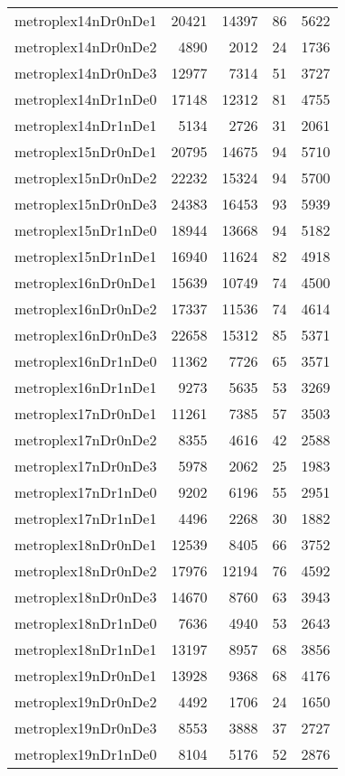 \begin{longtable}{lrrrr}
metroplex14nDr0nDe1 & 20421 & 14397 & 86 & 5622 \\
metroplex14nDr0nDe2 & 4890 & 2012 & 24 & 1736 \\
metroplex14nDr0nDe3 & 12977 & 7314 & 51 & 3727 \\
metroplex14nDr1nDe0 & 17148 & 12312 & 81 & 4755 \\
metroplex14nDr1nDe1 & 5134 & 2726 & 31 & 2061 \\
metroplex15nDr0nDe1 & 20795 & 14675 & 94 & 5710 \\
metroplex15nDr0nDe2 & 22232 & 15324 & 94 & 5700 \\
metroplex15nDr0nDe3 & 24383 & 16453 & 93 & 5939 \\
metroplex15nDr1nDe0 & 18944 & 13668 & 94 & 5182 \\
metroplex15nDr1nDe1 & 16940 & 11624 & 82 & 4918 \\
metroplex16nDr0nDe1 & 15639 & 10749 & 74 & 4500 \\
metroplex16nDr0nDe2 & 17337 & 11536 & 74 & 4614 \\
metroplex16nDr0nDe3 & 22658 & 15312 & 85 & 5371 \\
metroplex16nDr1nDe0 & 11362 & 7726 & 65 & 3571 \\
metroplex16nDr1nDe1 & 9273 & 5635 & 53 & 3269 \\
metroplex17nDr0nDe1 & 11261 & 7385 & 57 & 3503 \\
metroplex17nDr0nDe2 & 8355 & 4616 & 42 & 2588 \\
metroplex17nDr0nDe3 & 5978 & 2062 & 25 & 1983 \\
metroplex17nDr1nDe0 & 9202 & 6196 & 55 & 2951 \\
metroplex17nDr1nDe1 & 4496 & 2268 & 30 & 1882 \\
metroplex18nDr0nDe1 & 12539 & 8405 & 66 & 3752 \\
metroplex18nDr0nDe2 & 17976 & 12194 & 76 & 4592 \\
metroplex18nDr0nDe3 & 14670 & 8760 & 63 & 3943 \\
metroplex18nDr1nDe0 & 7636 & 4940 & 53 & 2643 \\
metroplex18nDr1nDe1 & 13197 & 8957 & 68 & 3856 \\
metroplex19nDr0nDe1 & 13928 & 9368 & 68 & 4176 \\
metroplex19nDr0nDe2 & 4492 & 1706 & 24 & 1650 \\
metroplex19nDr0nDe3 & 8553 & 3888 & 37 & 2727 \\
metroplex19nDr1nDe0 & 8104 & 5176 & 52 & 2876 \\

\end{longtable}
